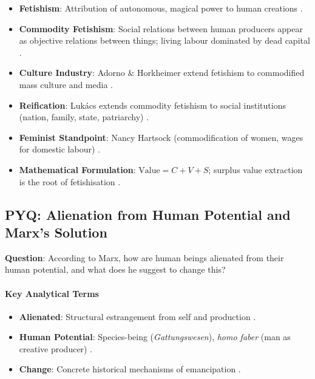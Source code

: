 \begin{QuickRevision}
\begin{itemize}
    \item \textbf{Fetishism}: Attribution of autonomous, magical power to human creations .
    \item \textbf{Commodity Fetishism}: Social relations between human producers appear as objective relations between things; living labour dominated by dead capital .
    \item \textbf{Culture Industry}: Adorno \& Horkheimer extend fetishism to commodified mass culture and media .
    \item \textbf{Reification}: Luk\'acs extends commodity fetishism to social institutions (nation, family, state, patriarchy) .
    \item \textbf{Feminist Standpoint}: Nancy Hartsock (commodification of women, wages for domestic labour) .
    \item \textbf{Mathematical Formulation}: $\text{Value} = C + V + S$; surplus value extraction is the root of fetishisation .
\end{itemize}
\end{QuickRevision}

\subsection{PYQ: Alienation from Human Potential and Marx's Solution}

\begin{PYQLink}
\textbf{Question}: According to Marx, how are human beings alienated from their human potential, and what does he suggest to change this? 
\end{PYQLink}

\paragraph{Key Analytical Terms}
\begin{itemize}
    \item \textbf{Alienated}: Structural estrangement from self and production .
    \item \textbf{Human Potential}: Species-being (\textit{Gattungswesen}), \textit{homo faber} (man as creative producer) .
    \item \textbf{Change}: Concrete historical mechanisms of emancipation .
\end{itemize}

